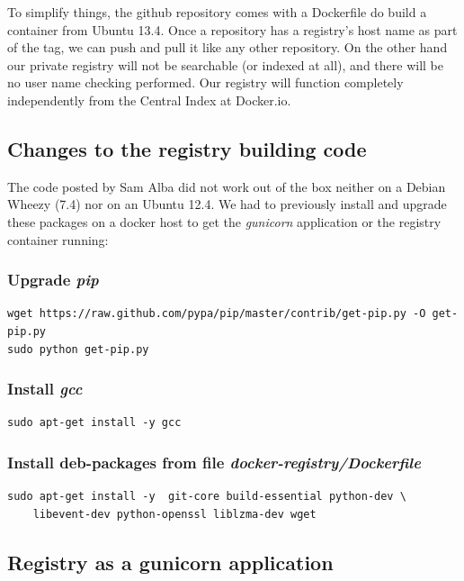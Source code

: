 \documentclass[captions=tableheading]{article}
\begin{document}
To simplify things, the github repository comes with a Dockerfile do build a container from Ubuntu 13.4.
Once a repository has a registry’s host name as part of the tag, we can push and pull it like any other repository. On the other hand our private registry will not be searchable (or indexed at all), and there will be no user name checking performed. Our registry will function completely independently from the Central Index at Docker.io.
\subsection{Changes to the registry building code}
\label{sec-3-3}

The code posted by Sam Alba did not work out of the box neither on a Debian Wheezy (7.4) nor on an Ubuntu 12.4. We had to previously install and upgrade these packages on a docker host to get the \emph{gunicorn} application or the registry container running:
\subsubsection{Upgrade \emph{pip}}
\label{sec-3-3-1}


\begin{verbatim}
wget https://raw.github.com/pypa/pip/master/contrib/get-pip.py -O get-pip.py
sudo python get-pip.py
\end{verbatim}
\subsubsection{Install \emph{gcc}}
\label{sec-3-3-2}


\begin{verbatim}
sudo apt-get install -y gcc
\end{verbatim}
\subsubsection{Install deb-packages from file \emph{docker-registry/Dockerfile}}
\label{sec-3-3-3}


\begin{verbatim}
sudo apt-get install -y  git-core build-essential python-dev \
    libevent-dev python-openssl liblzma-dev wget
\end{verbatim}
\subsection{Registry as a  gunicorn application}
\label{sec-3-4}
\end{document}
